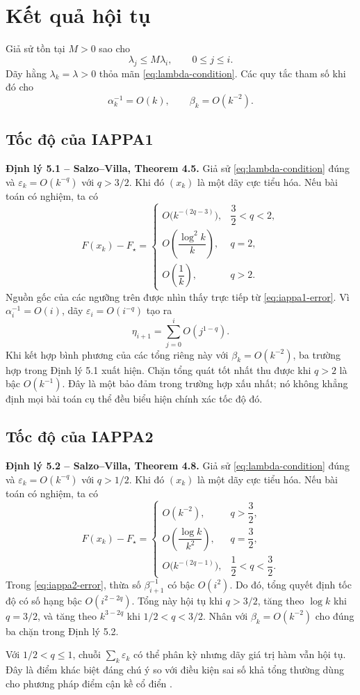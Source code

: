 \section{Kết quả hội tụ}

Giả sử tồn tại $M>0$ sao cho
\begin{equation}
\lambda_j\leq M\lambda_i,
\qquad 0\leq j\leq i.
\label{eq:lambda-condition}
\end{equation}
Dãy hằng $\lambda_k=\lambda>0$ thỏa mãn \eqref{eq:lambda-condition}. Các quy tắc tham số khi đó cho
\[
\alpha_k^{-1}=O(k),
\qquad
\beta_k=O(k^{-2}).
\]

\subsection{Tốc độ của IAPPA1}

\noindent\textbf{Định lý 5.1 -- Salzo--Villa, Theorem 4.5.}
Giả sử \eqref{eq:lambda-condition} đúng và $\varepsilon_k=O(k^{-q})$ với $q>3/2$. Khi đó $(x_k)$ là một dãy cực tiểu hóa. Nếu bài toán có nghiệm, ta có
\begin{equation}
F(x_k)-F_{\star}=
\begin{cases}
O\bigl(k^{-(2q-3)}\bigr), & \dfrac{3}{2}<q<2,\\[4pt]
O\left(\dfrac{\log^2 k}{k}\right), & q=2,\\[8pt]
O\left(\dfrac{1}{k}\right), & q>2.
\end{cases}
\label{eq:iappa1-rate}
\end{equation}
Nguồn gốc của các ngưỡng trên được nhìn thấy trực tiếp từ \eqref{eq:iappa1-error}. Vì $\alpha_i^{-1}=O(i)$, dãy $\varepsilon_i=O(i^{-q})$ tạo ra
\[
\eta_{i+1}=\sum_{j=0}^{i}O(j^{1-q}).
\]
Khi kết hợp bình phương của các tổng riêng này với $\beta_k=O(k^{-2})$, ba trường hợp trong Định lý 5.1 xuất hiện. Chặn tổng quát tốt nhất thu được khi $q>2$ là bậc $O(k^{-1})$. Đây là một bảo đảm trong trường hợp xấu nhất; nó không khẳng định mọi bài toán cụ thể đều biểu hiện chính xác tốc độ đó.

\subsection{Tốc độ của IAPPA2}

\noindent\textbf{Định lý 5.2 -- Salzo--Villa, Theorem 4.8.}
Giả sử \eqref{eq:lambda-condition} đúng và $\varepsilon_k=O(k^{-q})$ với $q>1/2$. Khi đó $(x_k)$ là một dãy cực tiểu hóa. Nếu bài toán có nghiệm, ta có
\begin{equation}
F(x_k)-F_{\star}=
\begin{cases}
O(k^{-2}), & q>\dfrac{3}{2},\\[4pt]
O\left(\dfrac{\log k}{k^2}\right), & q=\dfrac{3}{2},\\[8pt]
O\bigl(k^{-(2q-1)}\bigr), & \dfrac{1}{2}<q<\dfrac{3}{2}.
\end{cases}
\label{eq:iappa2-rate}
\end{equation}
Trong \eqref{eq:iappa2-error}, thừa số $\beta_{i+1}^{-1}$ có bậc $O(i^2)$. Do đó, tổng quyết định tốc độ có số hạng bậc $O(i^{2-2q})$. Tổng này hội tụ khi $q>3/2$, tăng theo $\log k$ khi $q=3/2$, và tăng theo $k^{3-2q}$ khi $1/2<q<3/2$. Nhân với $\beta_k=O(k^{-2})$ cho đúng ba chặn trong Định lý 5.2.

Với $1/2<q\leq1$, chuỗi $\sum_k\varepsilon_k$ có thể phân kỳ nhưng dãy giá trị hàm vẫn hội tụ. Đây là điểm khác biệt đáng chú ý so với điều kiện sai số khả tổng thường dùng cho phương pháp điểm cận kề cổ điển \cite{rockafellar1976,salzo2012}.

